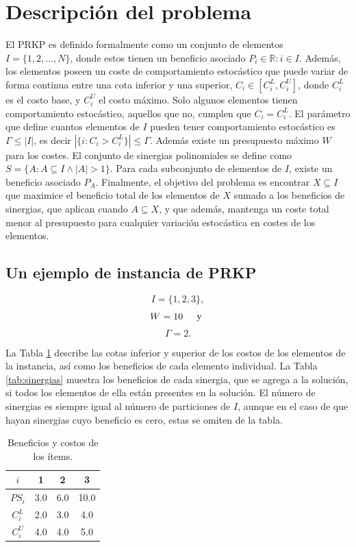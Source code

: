 \documentclass[spanish, a4paper, 12pt, openany,final]{book}
\begin{document}
\section{Descripción del problema}
	El PRKP es definido formalmente como un conjunto de elementos $I = \{1,2,\hdots,N\}$, donde estos tienen un beneficio asociado $P_i \in \mathbb{R}:i\in I$. Además, los elementos poseen un coste de comportamiento estocástico que puede variar de forma continua entre una cota inferior y una superior, $C_i \in [C^L_i,C^U_i]$, donde $C^L_i$ es el costo base, y $C^U_i$ el costo máximo. Solo algunos elementos tienen comportamiento estocástico, aquellos que no, cumplen que $C_i = C^L_i$. El parámetro que define cuantos elementos de $I$ pueden tener comportamiento estocástico es $\Gamma \leq |I|$, es decir $|\{i: C_i > C^L_i\}| \leq \Gamma$. 	Además existe un presupuesto máximo $W$ para los costes. El conjunto de sinergias polinomiales se define como $S = \{ A: A \subseteq I \land |A|>1  \}$. Para cada subconjunto de elementos de $I$, existe un beneficio asociado $P_A$. Finalmente, el objetivo del problema es encontrar $X \subseteq I$ que maximice el beneficio total de los elementos de $X$ sumado a los beneficios de sinergias, que aplican cuando $A\subseteq X$, y que además, mantenga un coste total menor al presupuesto para cualquier variación estocástica en costes de los elementos.
	
	\subsection*{Un ejemplo de instancia de PRKP}
		$$I =\{1,2,3\},$$
		$$W = 10 \hspace{0.5cm}\text{y }$$ 
		$$\Gamma = 2 \text{.}$$
		

	La Tabla \ref{tab:example_p} describe las cotas inferior y superior de los costos de los elementos de la instancia, así como los beneficios de cada elemento individual. La Tabla \ref{tab:sinergias} muestra los beneficios de cada sinergia, que se agrega a la solución, si todos los elementos de ella están presentes en la solución. El número de sinergias es siempre igual al número de particiones de $I$, aunque en el caso de que hayan sinergias cuyo beneficio es cero, estas se omiten de la tabla.
	
	\begin{table}[H]
		\centering
		
		\caption{Beneficios y costos de los ítems.}
		\label{tab:example_p}
	\begin{tabular}{|c|c|c|c|}
		\hline
		$i$ & 1 & 2 & 3 \\
		\hline
		$PS_i$ & 3.0 & 6.0 & 10.0 \\
		\hline
		$C^L_i$ & 2.0 & 3.0 & 4.0 \\
		\hline
		$C^U_i$ & 4.0 & 4.0 & 5.0 \\
		\hline
	\end{tabular}
	
	\end{table}
	
\end{document}
